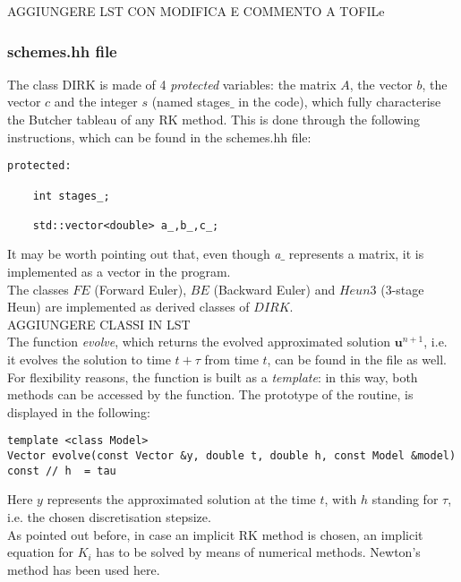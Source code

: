\documentclass[11pt]{article}
\theoremstyle{theorem}
\theoremstyle{definition}
\begin{document}
AGGIUNGERE LST CON MODIFICA E COMMENTO A TOFILe\\

\subsubsection{schemes.hh file}
\label{subsubsec:schemes}
The class DIRK is made of 4 \emph{protected} variables: the matrix $A$, the vector $b$, the vector $c$ and the integer $s$ (named stages$\_$ in the code), which fully characterise the Butcher tableau of any RK method. This is done through the following instructions, which can be found in the schemes.hh file:

\begin{lstlisting}
protected:

	int stages_;

	std::vector<double> a_,b_,c_;
\end{lstlisting}

It may be worth pointing out that, even though \emph{a$\_$} represents a matrix, it is implemented as a vector in the program.\\
The classes $FE$ (Forward Euler), $BE$ (Backward Euler) and $Heun3$ (3-stage Heun) are implemented as derived classes of $DIRK$.\\

AGGIUNGERE CLASSI IN LST\\


The function \emph{evolve}, which returns the evolved approximated solution $\mathbf{u}^{n+1}$, i.e. it evolves the solution to time $t+\tau$ from time $t$, can be found in the file as well. For flexibility reasons, the function is built as a \emph{template}: in this way, both methods can be accessed by the function. The prototype of the routine, is displayed in the following:

\begin{lstlisting}
template <class Model>
Vector evolve(const Vector &y, double t, double h, const Model &model) const // h  = tau
\end{lstlisting}

Here $y$ represents the approximated solution at the time $t$, with $h$ standing for $\tau$, i.e. the chosen discretisation stepsize.\\
As pointed out before, in case an implicit RK method is chosen, an implicit equation for $K_i$ has to be solved by means of numerical methods. Newton's method has been used here.\\
\end{document}
